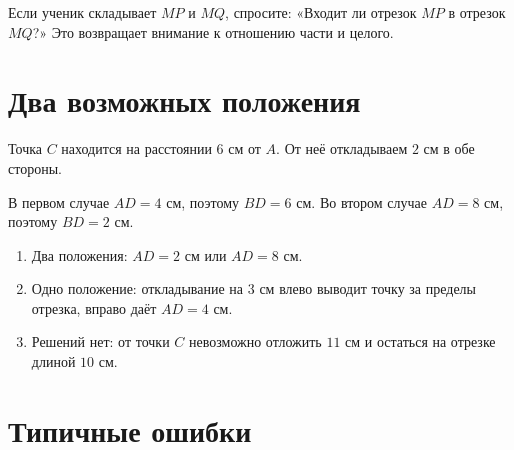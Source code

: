 \begin{teacherbox}[Диагностика]
  Если ученик складывает \(MP\) и \(MQ\), спросите: «Входит ли отрезок
  \(MP\) в отрезок \(MQ\)?» Это возвращает внимание к отношению части и
  целого.
\end{teacherbox}

\clearpage
\section{Два возможных положения}

\twopositionsfigure

\begin{practicebox}
  Точка \(C\) находится на расстоянии \(6\text{ см}\) от \(A\). От неё
  откладываем \(2\text{ см}\) в обе стороны.

  \studenttwocasesanswersfigure

  В первом случае \(AD=4\text{ см}\), поэтому \(BD=6\text{ см}\).
  Во втором случае \(AD=8\text{ см}\), поэтому \(BD=2\text{ см}\).
\end{practicebox}

\begin{checkpointbox}
  \begin{enumerate}[label=\alph*),itemsep=0.45em]
    \item Два положения: \(AD=2\text{ см}\) или \(AD=8\text{ см}\).
    \item Одно положение: откладывание на \(3\text{ см}\) влево выводит
      точку за пределы отрезка, вправо даёт \(AD=4\text{ см}\).
    \item Решений нет: от точки \(C\) невозможно отложить \(11\text{ см}\)
      и остаться на отрезке длиной \(10\text{ см}\).
  \end{enumerate}
\end{checkpointbox}

\candidatefilterfigure

\section{Типичные ошибки}

